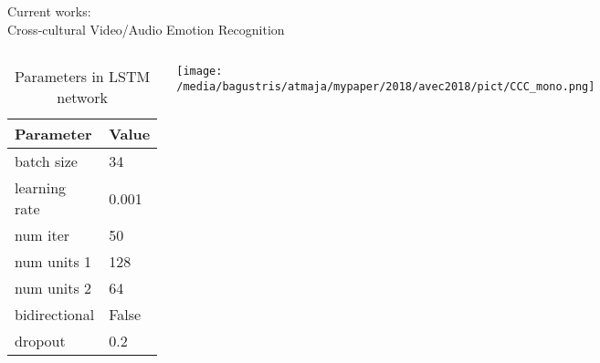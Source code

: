 \documentclass{beamer}
\begin{document}
\begin{frame}[t, fragile]{Current works: \\ Cross-cultural Video/Audio Emotion Recognition}
\begin{columns}
\begin{table}
  \caption{Parameters in LSTM network}
  \label{tab:lstm}
  \begin{tabular}{ll}
    \hline
    Parameter & Value \\
    \hline
    batch size    & 34       \\
    learning rate & 0.001    \\
    num iter      & 50      \\
    num units 1   & 128     \\
    num units 2   & 64      \\
    bidirectional & False    \\
    dropout       & 0.2     \\
    \hline
\end{tabular}
\end{table}
\texttt{[image: /media/bagustris/atmaja/mypaper/2018/avec2018/pict/CCC\_mono.png]}
\end{columns}
\end{frame}
\end{document}
